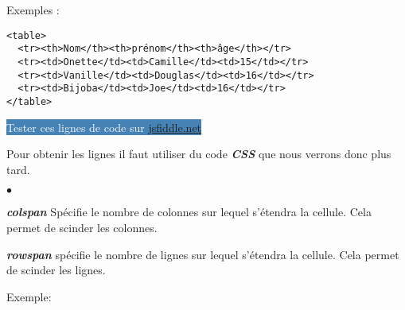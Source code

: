 \documentclass[10pt,dvipsnames, dvips, svgnames]{article}
\begin{document}
Exemples :

\begin{minipage}[t]{0.6\linewidth}
\begin{lstlisting}
<table>
  <tr><th>Nom</th><th>prénom</th><th>âge</th></tr>
  <tr><td>Onette</td><td>Camille</td><td>15</td></tr>
  <tr><td>Vanille</td><td>Douglas</td><td>16</td></tr>
  <tr><td>Bijoba</td><td>Joe</td><td>16</td></tr>
</table>
\end{lstlisting}
\end{minipage}
\begin{minipage}[t]{0.4\linewidth}
\vspace{1cm}
\begin{center}
\hypersetup{urlcolor=white}
\colorbox{SteelBlue}{\textcolor{white}{Tester ces lignes de code sur \href{https://jsfiddle.net/}{jsfiddle.net}}}
\hypersetup{urlcolor=blue}
\end{center}
\end{minipage}

Pour obtenir les lignes il faut utiliser du code \textbf{\textit{CSS}} que nous verrons donc  plus tard.


\begin{list}{$\bullet$}{}
\item \textbf{\textit{colspan}} Spécifie le nombre de colonnes sur lequel s'étendra la cellule.  Cela permet de scinder les colonnes.
\item \textbf{\textit{rowspan}} spécifie le nombre de lignes sur lequel s'étendra la cellule. Cela permet de scinder les lignes.
\end{list}

Exemple:
\end{document}

